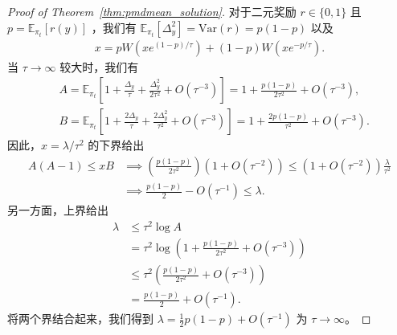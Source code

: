 \documentclass{article}
\theoremstyle{plain}
\theoremstyle{definition}
\theoremstyle{remark}
\newcommand{\E}{\mathbb{E}}
\newcommand{\Var}{\mathrm{Var}}
\newcommand{\cW}{W}
\begin{document}
\begin{proof}[Proof of Theorem~\ref{thm:pmdmean_solution}]
    对于二元奖励 $r\in\{0,1\}$ 且 $p=\E_{\pi_t}[r(y)]$ ，我们有 $\E_{\pi_t}[\Delta_y^2]=\Var(r)=p(1-p)$ 以及
    \begin{align}\label{eq:expression-x}
        x=p \cW(xe^{(1-p)/\tau}) + (1-p)\cW(xe^{-p/\tau}).
    \end{align}
    当 $\tau\to\infty$ 较大时，我们有 
    \begin{align*}
        &A=\mathbb{E}_{\pi_t}\left[1+\frac{\Delta_y}{\tau} + \frac{\Delta_y^2}{2\tau^2} + O(\tau^{-3})\right]=1+\frac{p(1-p)}{2\tau^2} + O(\tau^{-3}),\\
        &B=\mathbb{E}_{\pi_t}\left[1+\frac{2\Delta_y}{\tau} + \frac{2\Delta_y^2}{\tau^2} + O(\tau^{-3})\right]=1+\frac{2p(1-p)}{\tau^2} + O(\tau^{-3}).
    \end{align*}
    因此，$x=\lambda/\tau^2$ 的下界给出
    \begin{align*}
        A(A-1)\leq xB
        &\implies\left(\frac{p(1-p)}{2\tau^2}\right)\left(1+ O(\tau^{-2})\right)\leq \left(1+O(\tau^{-2})\right)\frac{\lambda}{\tau^2}\\
        &\implies \frac{p(1-p)}{2}-O(\tau^{-1})\leq\lambda.
    \end{align*}
    另一方面，上界给出
    \begin{align*}
        \lambda
        &\leq\tau^2\log A\\
        &=\tau^2\log\left(1+\frac{p(1-p)}{2\tau^2}+O(\tau^{-3})\right)\\
        &\leq\tau^2\left(\frac{p(1-p)}{2\tau^2}+O(\tau^{-3})\right)\\
        &=\frac{p(1-p)}{2}+O(\tau^{-1}).
    \end{align*}
    将两个界结合起来，我们得到 $\lambda=\frac{1}{2}p(1-p)+O(\tau^{-1})$ 为 $\tau\to\infty$。 


\end{proof}
\end{document}
